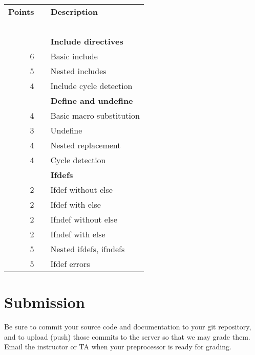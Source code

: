 \documentclass{article}
\makeatletter
\newcommand{\gradeline}{ \cline{1-2} \cline{4-4} ~\\[-1.5ex] }
\newenvironment{gradetable}{\begin{longtable}{@{}rrcp{5in}} \multicolumn{2}{l}{\bf Points} & & {\bf Description}\\ \gradeline}{\end{longtable}}
\newcommand{\mainitem}[2]{\pagebreak[2] {\bf #1} &&& {\bf #2}}
\newcommand{\inneritem}[2]{~ & #1 && #2}
\makeatother
\begin{document}
\noindent
\begin{gradetable}
  \mainitem{15}{Include directives}
  \\
  \inneritem{6}{Basic include}
  \\
	\inneritem{5}{Nested includes}
  \\
  \inneritem{4}{Include cycle detection}
  \\[4mm]

  \mainitem{15}{Define and undefine}
	\\
  \inneritem{4}{Basic macro substitution}
	\\
  \inneritem{3}{Undefine}
	\\
  \inneritem{4}{Nested replacement}
	\\
  \inneritem{4}{Cycle detection}
  \\[4mm]

  \mainitem{18}{Ifdefs}
  \\
  \inneritem{2}{Ifdef without else}
  \\
  \inneritem{2}{Ifdef with else}
  \\
  \inneritem{2}{Ifndef without else}
  \\
  \inneritem{2}{Ifndef with else}
  \\
  \inneritem{5}{Nested ifdefs, ifndefs}
  \\
  \inneritem{5}{Ifdef errors}
\end{gradetable}


\section{Submission}

Be sure to commit your source code and documentation to your
git repository, and to upload (push) those commits to the server
so that we may grade them.
Email the instructor or TA when your preprocessor is ready for grading.
\end{document}
